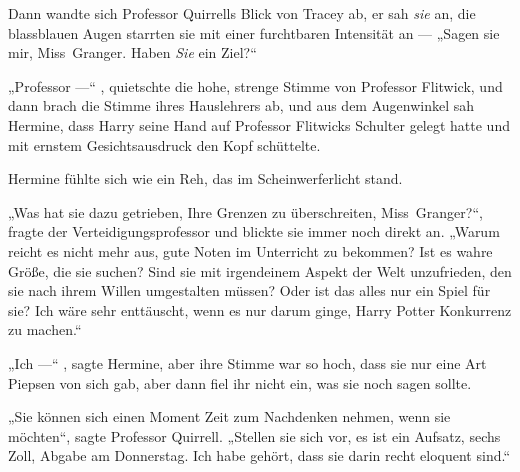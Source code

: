 Dann wandte sich Professor Quirrells Blick von Tracey ab, er sah \emph{sie} an, die blassblauen Augen starrten sie mit einer furchtbaren Intensität an —
„Sagen sie mir, Miss~Granger. Haben \emph{Sie} ein Ziel?“

„Professor —“ , quietschte die hohe, strenge Stimme von Professor Flitwick, und dann brach die Stimme ihres Hauslehrers ab, und aus dem Augenwinkel sah Hermine, dass Harry seine Hand auf Professor Flitwicks Schulter gelegt hatte und mit ernstem Gesichtsausdruck den Kopf schüttelte.

Hermine fühlte sich wie ein Reh, das im Scheinwerferlicht stand.

„Was hat sie dazu getrieben, Ihre Grenzen zu überschreiten, Miss~Granger?“, fragte der Verteidigungsprofessor und blickte sie immer noch direkt an.
„Warum reicht es nicht mehr aus, gute Noten im Unterricht zu bekommen? Ist es wahre Größe, die sie suchen? Sind sie mit irgendeinem Aspekt der Welt unzufrieden, den sie nach ihrem Willen umgestalten müssen? Oder ist das alles nur ein Spiel für sie? Ich wäre sehr enttäuscht, wenn es nur darum ginge, Harry Potter Konkurrenz zu machen.“

„Ich —“ , sagte Hermine, aber ihre Stimme war so hoch, dass sie nur eine Art Piepsen von sich gab, aber dann fiel ihr nicht ein, was sie noch sagen sollte.

„Sie können sich einen Moment Zeit zum Nachdenken nehmen, wenn sie möchten“, sagte Professor Quirrell.
„Stellen sie sich vor, es ist ein Aufsatz, sechs Zoll, Abgabe am Donnerstag. Ich habe gehört, dass sie darin recht eloquent sind.“

